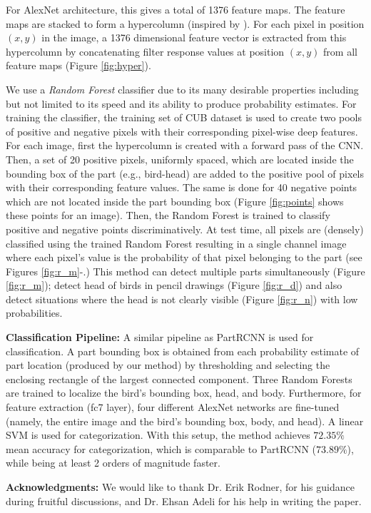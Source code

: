 \documentclass[10pt,twocolumn,letterpaper]{article}
\begin{document}
For AlexNet architecture, this gives a total of 1376 feature maps. The feature maps are stacked to form a hypercolumn (inspired by \cite{hypercolumn}). For each pixel in position $(x,y)$ in the image, a 1376 dimensional feature vector is extracted from this hypercolumn by concatenating filter response values at position $(x,y)$ from all feature maps (Figure \ref{fig:hyper}).

We use a {\it Random Forest} classifier due to its many desirable properties \cite{rf_book} including but not limited to its speed and its ability to produce probability estimates. For training the classifier, the training set of CUB \cite{cub} dataset is used to create two pools of positive and negative pixels with their corresponding pixel-wise deep features. For each image, first the hypercolumn is created with a forward pass of the CNN. Then, a set of 20 positive pixels, uniformly spaced, which are located inside the bounding box of the part (e.g., bird-head) are added to the positive pool of pixels with their corresponding feature values. The same is done for 40 negative points which are not located inside the part bounding box (Figure \ref{fig:points} shows these points for an image). Then, the Random Forest is trained to classify positive and negative points discriminatively. At test time, all pixels are (densely) classified using the trained Random Forest resulting in a single channel image where each pixel's value is the probability of that pixel belonging to the part (see Figures \ref{fig:r_m}-.) This method can detect multiple parts simultaneously (Figure \ref{fig:r_m}); detect head of birds in pencil drawings (Figure \ref{fig:r_d}) and also detect situations where the head is not clearly visible (Figure \ref{fig:r_n}) with low probabilities.

\textbf{Classification Pipeline:}
A similar pipeline as PartRCNN \cite{partrcnn} is used for classification.
A part bounding box is obtained from each probability estimate of part location (produced by our method) by thresholding and selecting the enclosing rectangle of the largest connected component.
Three Random Forests are trained to localize the bird's bounding box, head, and body. Furthermore, for feature extraction (fc7 layer), four different AlexNet networks are fine-tuned (namely, the entire image and the bird's bounding box, body, and head). 
A linear SVM is used for categorization. With this setup, the method achieves $72.35\%$ mean accuracy for categorization, which is comparable to PartRCNN \cite{partrcnn} ($73.89\%$), while being at least 2 orders of magnitude faster.

\textbf{Acknowledgments:}
We would like to thank Dr. Erik Rodner, for his guidance during fruitful discussions, and Dr. Ehsan Adeli for his help in writing the paper.

{\scriptsize


}
\end{document}
